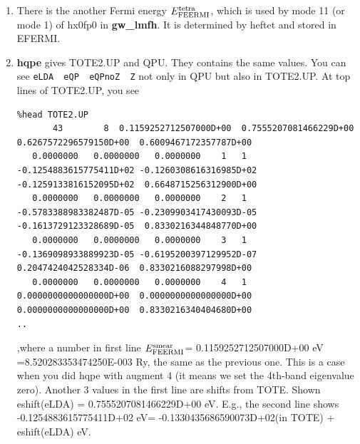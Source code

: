 \documentclass[a4paper,10pt,epsf,fleqn]{article}
\newcommand{\exe}[1]{{\bf #1}}
\newcommand{\io}[1]{{\sf  #1}}
\begin{document}
{\begin{enumerate}
This is the head of \io{TOTE.UP};
{\baselineskip=3mm \small
\begin{verbatim}
%head TOTE.UP
          43           8  8.520283353474250E-003
   0.0000000   0.0000000   0.0000000    1   1  -0.1330435686590073D+02 -0.1322984339282777D+02 -0.1319228487875673D+02  0.6648715256312900D+00
   0.0000000   0.0000000   0.0000000    2   1  -0.7555264915356062D+00 -0.6267595395613325D+00 -0.6009483309649021D+00  0.8330216344848770D+00
...
\end{verbatim}}

Here $E_{\rm FEERMI}^{\rm smear}$=8.520283353474250E-003. 
From the second lines, they are LDA eigenvalues and QP energies 
(Z included and Z=1); they are relative to the $E_{\rm FEERMI}^{\rm smear}$.\\
-13.18843159 eV - $E_{\rm FEERMI}^{\rm smear}$(which should be translated into in eV)  
= -0.1330435686590073D+02 eV.
Here -13.18843159 is the value in \io{VXCFP.chk} shown above.


\item
There is the another Fermi energy $E_{\rm FEERMI}^{\rm tetra}$, 
which is used by mode 11 (or mode 1) of hx0fp0 in {\bf gw\_lmfh}.
It is determined by heftet and stored in \io{EFERMI}.

\item
\exe{hqpe} gives \io{TOTE2.UP} and \io{QPU}. 
They contains the same values. You can see  
\verb#eLDA  eQP  eQPnoZ  Z# not only in \io{QPU} but also in \io{TOTE2.UP}.
At top lines of \io{TOTE2.UP}, you see  
{\baselineskip=3mm \small
\begin{verbatim}
%head TOTE2.UP
       43        8  0.1159252712507000D+00  0.7555207081466229D+00  0.6267572296579150D+00  0.6009467172357787D+00
   0.0000000   0.0000000   0.0000000    1   1  -0.1254883615775411D+02 -0.1260308616316985D+02 -0.1259133816152095D+02  0.6648715256312900D+00
   0.0000000   0.0000000   0.0000000    2   1  -0.5783388983382487D-05 -0.2309903417430093D-05 -0.1613729123328689D-05  0.8330216344848770D+00
   0.0000000   0.0000000   0.0000000    3   1  -0.1369098933889923D-05 -0.6195200397129952D-07  0.2047424042528334D-06  0.8330216088297998D+00
   0.0000000   0.0000000   0.0000000    4   1   0.0000000000000000D+00  0.0000000000000000D+00  0.0000000000000000D+00  0.8330216340404680D+00
..
\end{verbatim}}
,where a number in first line $E_{\rm FEERMI}^{\rm smear}$= 
0.1159252712507000D+00 eV =8.520283353474250E-003 Ry,
the same as the previous one.
This is a case when you did hqpe with augment 4 
(it means we set the 4th-band eigenvalue zero).
Another 3 values in the first line are shifts from \io{TOTE}.
Shown eshift(eLDA) = 0.7555207081466229D+00 eV.
E.g., the second line shows\\
-0.1254883615775411D+02 eV= -0.1330435686590073D+02(in TOTE) + eshift(eLDA) eV.\\


\end{enumerate}}
\end{document}
